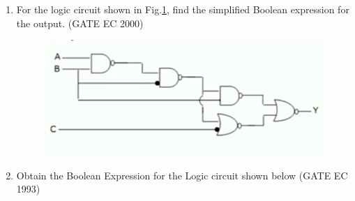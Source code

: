\begin{enumerate}
\item For the logic circuit shown in Fig.\ref{fig:2000/gate/ec/2/7}, find the simplified Boolean expression for the output. 
\label{prob:2000/gate/ec/2/7}
\hfill (GATE EC 2000)
\begin{figure}[H]
    \centering
    \includegraphics[width=\columnwidth]{figs/2000-gate-ec-2-7.jpg}
    \caption{}
\label{fig:2000/gate/ec/2/7}
\end{figure}
\item 
Obtain the Boolean Expression for the Logic circuit shown below
\label{prob:1993/gate/ec/4/8}
\hfill (GATE EC 1993)
	  	

\end{enumerate}
